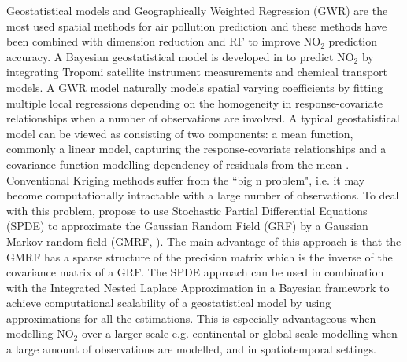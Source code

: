 \documentclass{article}
\begin{document}
Geostatistical models and Geographically Weighted Regression (GWR) are the most used spatial methods for air pollution prediction \citep{vicedo2013bayesian,li2014estimating,wang2021impacts,zou2016high} and these methods have been combined with dimension reduction \citep{zhai2018improved} and RF \citep{zhan2018satellite,liu2020integrate} to improve NO$_2$ prediction accuracy. A Bayesian geostatistical model is developed in \cite{BELOCONI2020105578} to predict NO$_2$ by integrating Tropomi satellite instrument measurements and chemical transport models. A GWR model naturally models spatial varying coefficients by fitting multiple local regressions depending on the homogeneity in response-covariate relationships when a number of observations are involved. A typical geostatistical model can be viewed as consisting of two components: a mean function, commonly a linear model, capturing the response-covariate relationships and a covariance function modelling dependency of residuals from the mean \citep{stackinla}. Conventional Kriging methods suffer from the ``big n problem", i.e. it may become computationally intractable with a large number of observations. To deal with this problem, \cite{lindgren2011explicit} propose to use Stochastic Partial Differential Equations (SPDE) to approximate the Gaussian Random Field (GRF) by a Gaussian Markov random field (GMRF, \cite{rue2005gaussian}). The main advantage of this approach is that the GMRF has a sparse structure of the precision matrix which is the inverse of the covariance matrix of a GRF. The SPDE approach can be used in combination with the Integrated Nested Laplace Approximation \citep[INLA, ][]{rue2009approximate} in a Bayesian framework to achieve computational scalability of a geostatistical model by using approximations for all the estimations. This is especially advantageous when  modelling NO$_2$ over a larger scale e.g. continental or global-scale modelling when a large amount of observations are modelled, and in spatiotemporal settings. 



\end{document}
